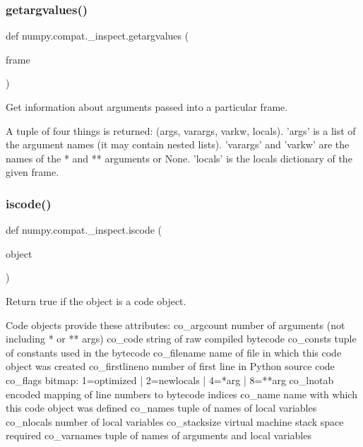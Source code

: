 \subsubsection{\texorpdfstring{getargvalues()}{getargvalues()}}
{\footnotesize\ttfamily def numpy.\+compat.\+\_\+inspect.\+getargvalues (\begin{DoxyParamCaption}\item[{}]{frame }\end{DoxyParamCaption})}

\begin{DoxyVerb}Get information about arguments passed into a particular frame.

A tuple of four things is returned: (args, varargs, varkw, locals).
'args' is a list of the argument names (it may contain nested lists).
'varargs' and 'varkw' are the names of the * and ** arguments or None.
'locals' is the locals dictionary of the given frame.\end{DoxyVerb}
 \mbox{\label{namespacenumpy_1_1compat_1_1__inspect_a71a2fe78ad81c44cd5ecafd51045568c}} 
\subsubsection{\texorpdfstring{iscode()}{iscode()}}
{\footnotesize\ttfamily def numpy.\+compat.\+\_\+inspect.\+iscode (\begin{DoxyParamCaption}\item[{}]{object }\end{DoxyParamCaption})}

\begin{DoxyVerb}Return true if the object is a code object.

Code objects provide these attributes:
    co_argcount     number of arguments (not including * or ** args)
    co_code         string of raw compiled bytecode
    co_consts       tuple of constants used in the bytecode
    co_filename     name of file in which this code object was created
    co_firstlineno  number of first line in Python source code
    co_flags        bitmap: 1=optimized | 2=newlocals | 4=*arg | 8=**arg
    co_lnotab       encoded mapping of line numbers to bytecode indices
    co_name         name with which this code object was defined
    co_names        tuple of names of local variables
    co_nlocals      number of local variables
    co_stacksize    virtual machine stack space required
    co_varnames     tuple of names of arguments and local variables\end{DoxyVerb}
 \mbox{\label{namespacenumpy_1_1compat_1_1__inspect_a669c0eb73402e8093553b02da2044fed}} 
